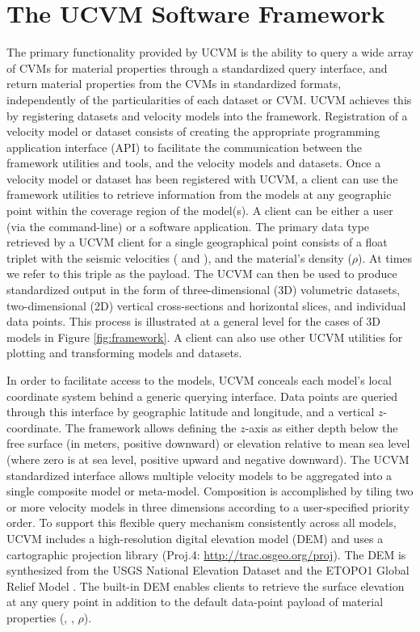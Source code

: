 






\section{The UCVM Software Framework}\label{sec:ucvm}

The primary functionality provided by UCVM is the ability to query a wide array of CVMs for material properties through a standardized query interface, and return material properties from the CVMs in standardized formats, independently of the particularities of each dataset or CVM. UCVM achieves this by registering datasets and velocity models into the framework. Registration of a velocity model or dataset consists of creating the appropriate programming application interface (API) to facilitate the communication between the framework utilities and tools, and the velocity models and datasets. Once a velocity model or dataset has been registered with UCVM, a client can use the framework utilities to retrieve information from the models at any geographic point within the coverage region of the model(s). A client can be either a user (via the command-line) or a software application. The primary data type retrieved by a UCVM client for a single geographical point consists of a float triplet with the seismic velocities (\vp{} and \vs{}), and the material's density ($\rho$). At times we refer to this triple as the payload. The UCVM can then be used to produce standardized output in the form of three-dimensional (3D) volumetric datasets, two-dimensional (2D) vertical cross-sections and horizontal slices, and individual data points. This process is illustrated at a general level for the cases of 3D models in Figure \ref{fig:framework}. A client can also use other UCVM utilities for plotting and transforming models and datasets.

In order to facilitate access to the models, UCVM conceals each model's local coordinate system behind a generic querying interface. Data points are queried through this interface by geographic latitude and longitude, and a vertical $z$-coordinate. The framework allows defining the $z$-axis as either depth below the free surface (in meters, positive downward) or elevation relative to mean sea level (where zero is at sea level, positive upward and negative downward). The UCVM standardized interface allows multiple velocity models to be aggregated into a single composite model or meta-model. Composition is accomplished by tiling two or more velocity models in three dimensions according to a user-specified priority order. To support this flexible query mechanism consistently across all models, UCVM includes a high-resolution digital elevation model (DEM) and uses a cartographic projection library (Proj.4: \url{http://trac.osgeo.org/proj}). The DEM is synthesized from the USGS National Elevation Dataset \citep{Gesch_2002_PERS, Gesch_2007_Chap} and the ETOPO1 Global Relief Model \citep{Amante_2009_Manual}. The built-in DEM enables clients to retrieve the surface elevation at any query point in addition to the default data-point payload of material properties (\vp{}, \vs{}, $\rho$).

